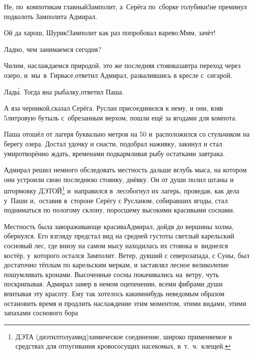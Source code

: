 \diagdash Не, по~компотикам главный\mdash Замполит, а~Серёга по~сборке голубики!\mdash не преминул подколоть Замполита Адмирал.

\diagdash Ой да харош, Шурик!\mdash Замполит как раз попробовал варево:\mdash М\sdash м\sdash м, зачёт!


\diagdash Ладно, чем занимаемся сегодня?

\diagdash Чилим, наслаждаемся природой, это же последняя стоянка\mdash завтра переход через озеро, и~мы~в~Гирвасе,\mdash ответил Адмирал, развалившись в кресле с~сигарой.

\diagdash Лад\'{ы}. Тогда я\mdash на рыбалку,\mdash ответил Паша.

\diagdash А я\mdash за черникой,\mdash сказал Серёга. Руслан присоединился к нему, и они, взяв 5\sdash литровую бутыль с~обрезанным верхом, пошли ещё за ягодами для компота.

Паша отошёл от лагеря буквально метров на 50 и~расположился со стульчиком на берегу озера. Достал удочку и снасти, подобрал наживку, закинул и стал умиротворённо ждать, временами подкармливая рыбу остатками завтрака. %

Адмирал решил немного обследовать местность дальше вглубь мыса, на котором они устроили свою последнюю стоянку, днёвку. Он от души полил штаны и штормовку ДЭТОЙ\footnote{ДЭТА (диэтилтолуамид)\mdash химическое соединение, широко применяемое в средствах для отпугивания кровососущих насекомых, в~т.~ч.~клещей.} и~направился в~лес\mdash обогнул их лагерь, проведав, как дела у~Паши и,~оставив в~стороне Серёгу с Русланом, собиравших ягоды, стал подниматься по пологому склону, поросшему высокими красивыми соснами. 

Местность была завораживающе красива\mdash Адмирал, дойдя до вершины холма, обернулся. Его взгляду предстал вид на средней густоты светлый карельский сосновый лес, где внизу на самом мысу находилась их стоянка и~виднелся костёр, у~которого остался Замполит. Ветер, дувший с северо\sdash запада, с Суны, был достаточно тёплым по карельским меркам, и заставлял лесное великолепие пошумливать кронами. Высоченные сосны покачивались на~ветру, чуть поскрипывая. Адмирал замер в немом оцепенении, всеми фибрами души впитывая эту красоту. Ему так хотелось каким\sdash нибудь неведомым образом остановить время и продлить наслаждение этим моментом, этими видами, этими запахами соснового бора\myldots{} 

